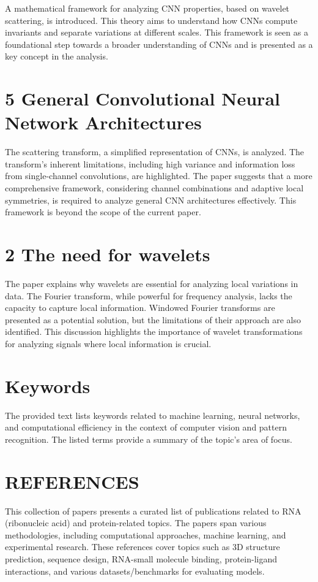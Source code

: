 \documentclass{article}
\begin{document}
A mathematical framework for analyzing CNN properties, based on wavelet scattering, is introduced.  This theory aims to understand how CNNs compute invariants and separate variations at different scales.  This framework is seen as a foundational step towards a broader understanding of CNNs and is presented as a key concept in the analysis.


\section*{5 General Convolutional Neural Network Architectures}

The scattering transform, a simplified representation of CNNs, is analyzed. The transform's inherent limitations, including high variance and information loss from single-channel convolutions, are highlighted. The paper suggests that a more comprehensive framework, considering channel combinations and adaptive local symmetries, is required to analyze general CNN architectures effectively. This framework is beyond the scope of the current paper.


\section*{2 The need for wavelets}

The paper explains why wavelets are essential for analyzing local variations in data.  The Fourier transform, while powerful for frequency analysis, lacks the capacity to capture local information. Windowed Fourier transforms are presented as a potential solution, but the limitations of their approach are also identified. This discussion highlights the importance of wavelet transformations for analyzing signals where local information is crucial.


\section*{Keywords}

The provided text lists keywords related to machine learning, neural networks, and computational efficiency in the context of computer vision and pattern recognition. The listed terms provide a summary of the topic's area of focus.


\section*{REFERENCES}

This collection of papers presents a curated list of publications related to RNA (ribonucleic acid) and protein-related topics.  The papers span various methodologies, including computational approaches, machine learning, and experimental research.  These references cover topics such as 3D structure prediction, sequence design, RNA-small molecule binding, protein-ligand interactions, and various datasets/benchmarks for evaluating models.
\end{document}
